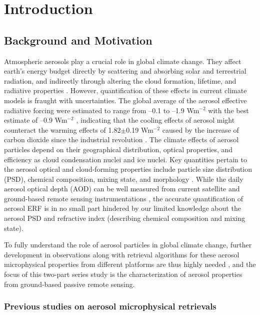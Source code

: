 \chapter{Introduction}

\section{Background and Motivation}

Atmospheric aerosols play a crucial role in global climate change. They
affect earth's energy budget directly by scattering and absorbing solar and
terrestrial radiation, and indirectly through altering the cloud formation,
lifetime, and radiative properties \citep{Haywood00,Ramanathan01}.
However, quantification of these effects in current climate models is fraught
with uncertainties. The global average of the aerosol effective radiative 
forcing were estimated to range from --0.1 to --1.9 Wm$^{-2}$ with the best 
estimate of --0.9 Wm$^{-2}$ \citep{Boucher13}, indicating that the cooling
effects of aerosol might counteract the warming effects of 1.82$\pm$0.19 
Wm$^{-2}$ caused by the increase of carbon dioxide since the industrial 
revolution \citep{Myhre13}. The climate effects of aerosol particles depend 
on their geographical distribution, optical properties, and efficiency as 
cloud condensation nuclei and ice nuclei. 
Key quantities pertain to the aerosol optical and
cloud-forming properties include particle size distribution (PSD), chemical
composition, mixing state, and morphology \citep{Boucher13}. While the
daily aerosol optical depth (AOD) can be well measured from current satellite
and ground-based remote sensing instrumentations \citep[e.g.,][]{Holben98,Kaufman02},
the accurate quantification of aerosol ERF is in no
small part hindered by our limited knowledge about the aerosol PSD and
refractive index (describing chemical composition and mixing state). 

To fully understand the role of aerosol particles in global climate change, 
further development in observations along with retrieval algorithms for these
aerosol microphysical properties from different platforms are thus highly
needed \citep{Mishchenko04}, and the focus of this two-part series study
is the characterization of aerosol properties from ground-based passive remote
sensing.

\subsection{Previous studies on aerosol microphysical retrievals}

